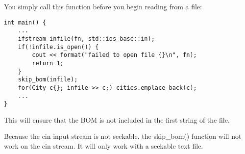 You simply call this function before you begin reading from a file:

\begin{lstlisting}[style=styleCXX]
int main() {
	...
	ifstream infile(fn, std::ios_base::in);
	if(!infile.is_open()) {
		cout << format("failed to open file {}\n", fn);
		return 1;
	}
	skip_bom(infile);
	for(City c{}; infile >> c;) cities.emplace_back(c);
	...
}
\end{lstlisting}

This will ensure that the BOM is not included in the first string of the file.

\begin{tcolorbox}[colback=webgreen!5!white,colframe=webgreen!75!black,title=Note]
Because the cin input stream is not seekable, the skip\_bom() function will not work on the cin stream. It will only work with a seekable text file.
\end{tcolorbox}












